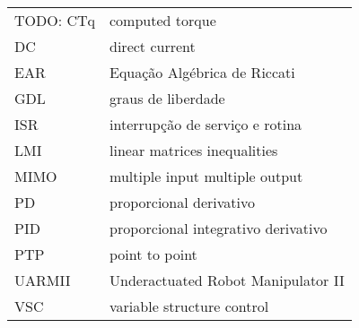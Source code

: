 \begin{longtable}{ll}
TODO:
CTq & computed torque \\
DC & direct current \\
EAR & Equação Algébrica de Riccati \\
GDL & graus de liberdade \\
ISR & interrupção de serviço e rotina \\
LMI & linear matrices inequalities \\
MIMO & multiple input multiple output \\
PD & proporcional derivativo \\
PID & proporcional integrativo derivativo \\
PTP & point to point \\
UARMII & Underactuated Robot Manipulator II \\
VSC & variable structure control \\

\end{longtable}

